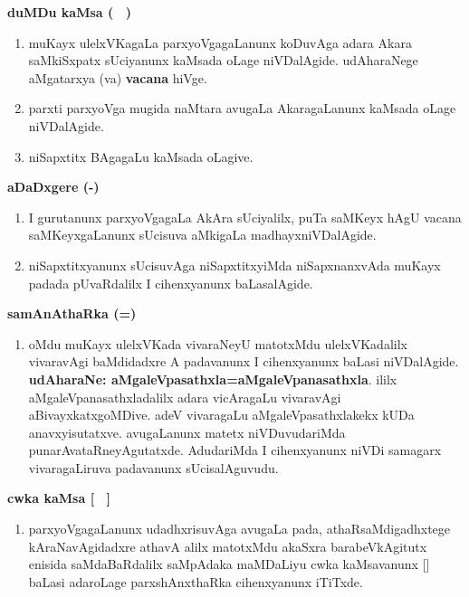 \smallskip

\begin{center}
\textbf{duMDu kaMsa (~ )}
\end{center}
\begin{enumerate}
\item muKayx ulelxVKagaLa parxyoVgagaLanunx koDuvAga adara Akara saMkiSxpatx sUciyanunx kaMsada oLage niVDalAgide. udAharaNege aMgatarxya (va) \textbf{vacana} hiVge.

\item parxti parxyoVga mugida naMtara avugaLa AkaragaLanunx kaMsada oLage niVDalAgide.

\item niSapxtitx BAgagaLu kaMsada oLagive.
\end{enumerate}
\begin{center}
\textbf{aDaDxgere (-)}
\end{center}
\begin{enumerate}
\item I gurutanunx parxyoVgagaLa AkAra sUciyalilx, puTa saMKeyx hAgU vacana saMKeyxgaLanunx sUcisuva aMkigaLa madhayx\break niVDalAgide.

\item niSapxtitxyanunx sUcisuvAga niSapxtitxyiMda niSapxnanxvAda muKayx padada pUvaRdalilx I cihenxyanunx baLasalAgide.
\end{enumerate}
\begin{center}
\textbf{samAnAthaRka (=)}
\end{center}
\begin{enumerate}
\item oMdu muKayx ulelxVKada vivaraNeyU matotxMdu ulelxVKadalilx vivaravAgi baMdidadxre A padavanunx I cihenxyanunx baLasi niVDalAgide. \textbf{udAharaNe: aMgaleVpasathxla=aMgaleVpanasathxla}. ililx aMgaleVpanasathxladalilx adara vicAragaLu vivara\-vAgi aBivayxkatxgoMDive. adeV vivaragaLu aMgaleVpasathxlakekx kUDa anavxyisutatxve. avugaLanunx matetx niVDuvudariMda punarA\-vataRneyAgutatxde. AdudariMda I cihenxyanunx niVDi samagarx vivaragaLiruva padavanunx sUcisalAguvudu.
\end{enumerate}
\begin{center}
\textbf{cwka kaMsa [~ ]}
\end{center}
\begin{enumerate}
\item parxyoVgagaLanunx udadhxrisuvAga avugaLa pada, athaRsaMdigadhxtege kAraNavAgidadxre athavA alilx matotxMdu akaSxra barabeVkA\-gitutx enisida saMdaBaRdalilx saMpAdaka maMDaLiyu cwka kaMsavanunx [] baLasi adaroLage parxshAnxthaRka cihenxyanunx iTiTxde.
\end{enumerate}

